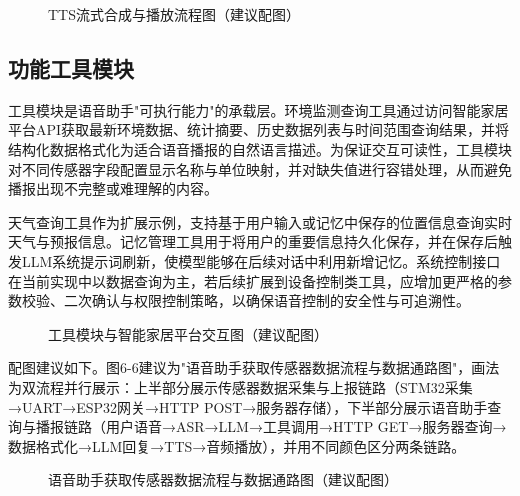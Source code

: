 \begin{figure}[H]
\centering
{}
\caption{TTS流式合成与播放流程图（建议配图）}
\label{fig:tts_flow}
\end{figure}

\subsection{功能工具模块}
\par 工具模块是语音助手"可执行能力"的承载层。环境监测查询工具通过访问智能家居平台API获取最新环境数据、统计摘要、历史数据列表与时间范围查询结果，并将结构化数据格式化为适合语音播报的自然语言描述。为保证交互可读性，工具模块对不同传感器字段配置显示名称与单位映射，并对缺失值进行容错处理，从而避免播报出现不完整或难理解的内容。
\par 天气查询工具作为扩展示例，支持基于用户输入或记忆中保存的位置信息查询实时天气与预报信息。记忆管理工具用于将用户的重要信息持久化保存，并在保存后触发LLM系统提示词刷新，使模型能够在后续对话中利用新增记忆。系统控制接口在当前实现中以数据查询为主，若后续扩展到设备控制类工具，应增加更严格的参数校验、二次确认与权限控制策略，以确保语音控制的安全性与可追溯性。

\begin{figure}[H]
\centering
{}
\caption{工具模块与智能家居平台交互图（建议配图）}
\label{fig:tool_module_interaction}
\end{figure}

\par 配图建议如下。图6-6建议为"语音助手获取传感器数据流程与数据通路图"，画法为双流程并行展示：上半部分展示传感器数据采集与上报链路（STM32采集→UART→ESP32网关→HTTP POST→服务器存储），下半部分展示语音助手查询与播报链路（用户语音→ASR→LLM→工具调用→HTTP GET→服务器查询→数据格式化→LLM回复→TTS→音频播放），并用不同颜色区分两条链路。
\begin{figure}[H]
\centering
{}
\caption{语音助手获取传感器数据流程与数据通路图（建议配图）}
\label{fig:voice_sensor_data_flow}
\end{figure}
